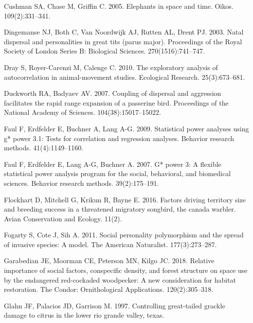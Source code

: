 \documentclass[
]{article}
\begin{document}
\leavevmode\hypertarget{ref-cushman2005elephants}{}%
Cushman SA, Chase M, Griffin C. 2005. Elephants in space and time.
Oikos. 109(2):331--341.

\leavevmode\hypertarget{ref-dingemanse2003natal}{}%
Dingemanse NJ, Both C, Van Noordwijk AJ, Rutten AL, Drent PJ. 2003.
Natal dispersal and personalities in great tits (parus major).
Proceedings of the Royal Society of London Series B: Biological
Sciences. 270(1516):741--747.

\leavevmode\hypertarget{ref-dray2010exploratory}{}%
Dray S, Royer-Carenzi M, Calenge C. 2010. The exploratory analysis of
autocorrelation in animal-movement studies. Ecological Research.
25(3):673--681.

\leavevmode\hypertarget{ref-duckworth2007coupling}{}%
Duckworth RA, Badyaev AV. 2007. Coupling of dispersal and aggression
facilitates the rapid range expansion of a passerine bird. Proceedings
of the National Academy of Sciences. 104(38):15017--15022.

\leavevmode\hypertarget{ref-faul2009statistical}{}%
Faul F, Erdfelder E, Buchner A, Lang A-G. 2009. Statistical power
analyses using g* power 3.1: Tests for correlation and regression
analyses. Behavior research methods. 41(4):1149--1160.

\leavevmode\hypertarget{ref-faul2007g}{}%
Faul F, Erdfelder E, Lang A-G, Buchner A. 2007. G* power 3: A flexible
statistical power analysis program for the social, behavioral, and
biomedical sciences. Behavior research methods. 39(2):175--191.

\leavevmode\hypertarget{ref-flockhart2016factors}{}%
Flockhart D, Mitchell G, Krikun R, Bayne E. 2016. Factors driving
territory size and breeding success in a threatened migratory songbird,
the canada warbler. Avian Conservation and Ecology. 11(2).

\leavevmode\hypertarget{ref-fogarty2011social}{}%
Fogarty S, Cote J, Sih A. 2011. Social personality polymorphism and the
spread of invasive species: A model. The American Naturalist.
177(3):273--287.

\leavevmode\hypertarget{ref-garabedian2018relative}{}%
Garabedian JE, Moorman CE, Peterson MN, Kilgo JC. 2018. Relative
importance of social factors, conspecific density, and forest structure
on space use by the endangered red-cockaded woodpecker: A new
consideration for habitat restoration. The Condor: Ornithological
Applications. 120(2):305--318.

\leavevmode\hypertarget{ref-glahn1997controlling}{}%
Glahn JF, Palacios JD, Garrison M. 1997. Controlling great-tailed
grackle damage to citrus in the lower rio grande valley, texas.
\end{document}
